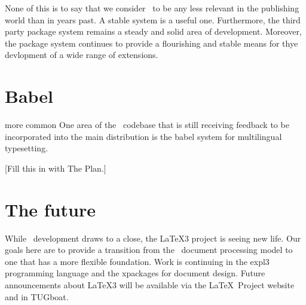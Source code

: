 \documentclass{ltnews}
\begin{document}
None of this is to say that we consider \LaTeXe\ to be any less
relevant in the publishing world than in years past. A stable system
is a useful one. Furthermore, the third party package system remains a
steady and solid area of development.
Moreover, the package system continues to provide a flourishing and stable
means
for thye devlopment of a wide range of extensions.

\section{Babel}

more common
One area of the \LaTeXe\ codebase that is still receiving feedback to
be incorporated into the main distribution is the babel system for
multilingual typesetting.

[Fill this in with The Plan.]


\section{The future}

While \LaTeXe\ development draws to a close, the \LaTeX3 project is
seeing new life. Our goals here are to provide a transition from the
\LaTeXe\ document processing model to one that has a more flexible
foundation. Work is continuing in the \textsf{expl3} programming
language and the \textsf{xpackages} for document design. Future
announcements
about \LaTeX3 will be available via the \LaTeX\ Project
website and in TUGboat.
\end{document}
